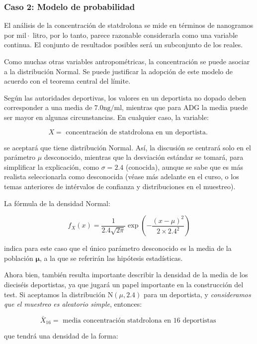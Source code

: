 \documentclass[
]{article}
\begin{document}
\subsubsection{Caso 2: Modelo de probabilidad}\label{caso-2-modelo-de-probabilidad}

El análisis de la concentración de statdrolona se mide en términos de nanogramos por \(\mathrm{mil} \cdot\) litro, por lo tanto, parece razonable considerarla como una variable continua. El conjunto de resultados posibles será un subconjunto de los reales.

Como muchas otras variables antropométricas, la concentración se puede asociar a la distribución Normal. Se puede justificar la adopción de este modelo de acuerdo con el teorema central del límite.

Según las autoridades deportivas, los valores en un deportista no dopado deben corresponder a una media de \(7.0 \mathrm{ng} / \mathrm{ml}\), mientras que para ADG la media puede ser mayor en algunas circunstancias. En cualquier caso, la variable:

\[
X=\text { concentración de statdrolona en un deportista. }
\]

se aceptará que tiene distribución Normal. Así, la discusión se centrará solo en el parámetro \(\mu\) desconocido, mientras que la desviación estándar se tomará, para simplificar la explicación, como \(\sigma=2.4\) (conocida), aunque se sabe que es más realista seleccionarla como desconocida (véase más adelante en el curso, o los temas anteriores de intérvalos de confianza y distribuciones en el muestreo).

La fórmula de la densidad Normal:

\[
f_{X}(x)=\frac{1}{2.4 \sqrt{2 \pi}} \exp \left(-\frac{(x-\mu)^{2}}{2 \times 2.4^{2}}\right)
\]

indica para este caso que el único parámetro desconocido es la media de la población \(\boldsymbol{\mu}\), a la que se referirán las hipótesis estadísticas.

Ahora bien, también resulta importante describir la densidad de la media de los dieciséis deportistas, ya que jugará un papel importante en la construcción del test. Si aceptamos la distribución \(\mathrm{N}(\mu, 2.4)\) para un deportista, y \emph{consideramos que el muestreo es aleatorio simple}, entonces:

\[
\bar{X}_{16}=\text { media concentración statdrolona en } 16 \text { deportistas }
\]

que tendrá una densidad de la forma:
\end{document}
